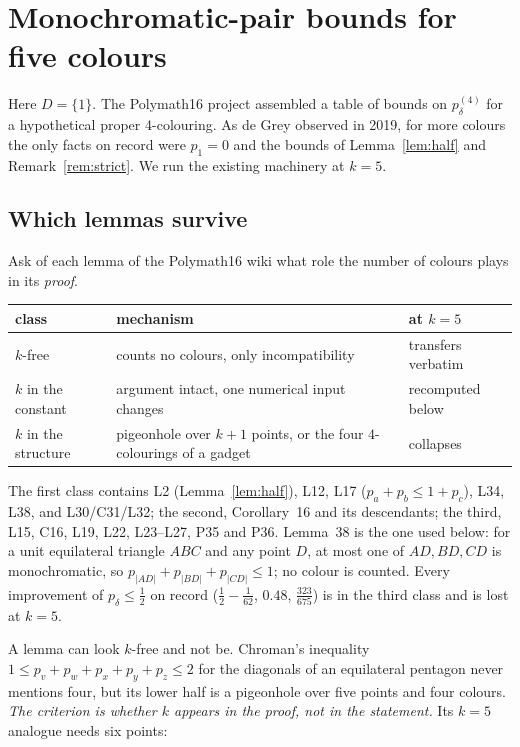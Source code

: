 \documentclass[11pt,a4paper]{amsart}
\theoremstyle{remark}
\begin{document}
\section{Monochromatic-pair bounds for five colours}\label{sec:five}

Here $D=\{1\}$. The Polymath16 project assembled a table of bounds on $p^{(4)}_\delta$ for a hypothetical proper $4$-colouring. As de Grey observed in 2019, for more colours the only facts on record were $p_1=0$ and the bounds of Lemma~\ref{lem:half} and Remark~\ref{rem:strict}. We run the existing machinery at $k=5$.

\subsection{Which lemmas survive}\label{sec:survive}

Ask of each lemma of the Polymath16 wiki what role the number of colours plays in its \emph{proof}.

\begin{center}
\small
\begin{tabular}{p{3cm}p{6cm}p{4.4cm}}
\toprule
class & mechanism & at $k=5$\\
\midrule
$k$-free & counts no colours, only incompatibility & transfers verbatim\\
$k$ in the constant & argument intact, one numerical input changes & recomputed below\\
$k$ in the structure & pigeonhole over $k+1$ points, or the four $4$-colourings of a gadget & collapses\\
\bottomrule
\end{tabular}
\end{center}

The first class contains L2 (Lemma~\ref{lem:half}), L12, L17 ($p_a+p_b\le1+p_c$), L34, L38, and L30/C31/L32; the second, Corollary~16 and its descendants; the third, L15, C16, L19, L22, L23--L27, P35 and P36. Lemma~38 is the one used below: for a unit equilateral triangle $ABC$ and any point $D$, at most one of $AD,BD,CD$ is monochromatic, so $p_{|AD|}+p_{|BD|}+p_{|CD|}\le1$; no colour is counted. Every improvement of $p_\delta\le\tfrac12$ on record ($\tfrac12-\tfrac1{62}$, $0.48$, $\tfrac{323}{675}$) is in the third class and is lost at $k=5$.

A lemma can look $k$-free and not be. Chroman's inequality $1\le p_v+p_w+p_x+p_y+p_z\le2$ for the diagonals of an equilateral pentagon never mentions four, but its lower half is a pigeonhole over five points and four colours. \emph{The criterion is whether $k$ appears in the proof, not in the statement.} Its $k=5$ analogue needs six points:
\end{document}
